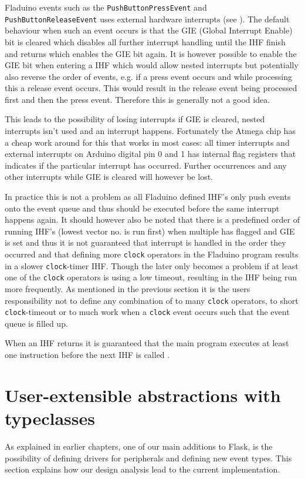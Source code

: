 \documentclass[a4paper, oneside, final]{memoir}
\let\fref\undefined
\begin{document}
Fladuino events such as the \texttt{PushButtonPressEvent} and
\texttt{PushButtonReleaseEvent} uses external hardware interrupts (see
\fref{sec:external-interrupts}). The default behaviour when such an event occurs
is that the GIE (Global Interrupt Enable) bit is cleared which disables all
further interrupt handling until the IHF finish and returns which enables the
GIE bit again. It is however possible to enable the GIE bit when entering a IHF
which would allow nested interrupts \cite[Section 4.7 page 14]{atmel8p} but
potentially also reverse the order of events, e.g. if a press event occurs and
while processing this a release event occurs. This would result in the release
event being processed first and then the press event. Therefore this is
generally not a good idea.

This leads to the possibility of losing interrupts if GIE is cleared, nested
interrupts isn't used and an interrupt happens. Fortunately the Atmega chip has
a cheap work around for this that works in most cases: all timer interrupts and
external interrupts on Arduino digital pin 0 and 1 has internal flag registers
that indicates if the particular interrupt has occurred. Further occurrences and
any other interrupts while GIE is cleared will however be lost.

In practice this is not a problem as all Fladuino defined IHF's only push events
onto the event queue and thus should be executed before the same interrupt
happens again. It should however also be noted that there is a predefined order
of running IHF's \cite[Section 9 page 57]{atmel8p} (lowest vector no. is run
first) when multiple has flagged and GIE is set and thus it is not guaranteed
that interrupt is handled in the order they occurred and that defining more
\texttt{clock} operators in the Fladuino program results in a slower
\texttt{clock}-timer IHF. Though the later only becomes a problem if at least
one of the \texttt{clock} operators is using a low timeout, resulting in the IHF
being run more frequently. As mentioned in the previous section it is the users
responsibility not to define any combination of to many \texttt{clock}
operators, to short \texttt{clock}-timeout or to much work when a \texttt{clock}
event occurs such that the event queue is filled up.

When an IHF returns it is guaranteed that the main program executes at least
one instruction before the next IHF is called \cite[Section 4.7 page 14]{atmel8p}.


\section{User-extensible abstractions with typeclasses}
\label{sec:user-extens-abstr}
As explained in earlier chapters, one of our main additions to Flask,
is the possibility of defining drivers for peripherals and defining
new event types. This section explains how our design analysis lead to
the current implementation.
\end{document}
